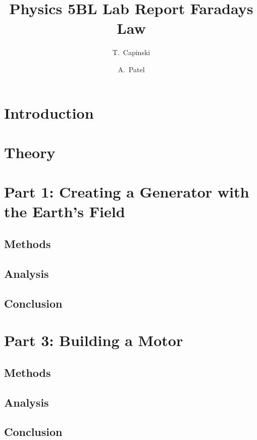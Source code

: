 \documentclass[11pt]{article}
\title{Physics 5BL Lab Report Faradays Law}
\author{T.~Capinski \and A.~Patel}
\let\oldsection\section
\renewcommand\section{\clearpage\oldsection}
\begin{document}
    \maketitle
    \tableofcontents

    \section*{Introduction}\label{sec:introduction}


    \section*{Theory}\label{sec:theory}


    \section{Part 1: Creating a Generator with the Earth’s Field}\label{sec:part_1}
    \subsection{Methods}\label{subsec:part_1_methods}
    \subsection{Analysis}\label{subsec:part_1_analsysis}
    \subsection{Conclusion}\label{subsec:part_1_conclusion}

    \section{Part 3: Building a Motor }\label{sec:part_3}
    \subsection{Methods}\label{subsec:part_3_methods}
    \subsection{Analysis}\label{subsec:part_3_analsysis}
    \subsection{Conclusion}\label{subsec:part_3_conclusion}
\end{document}
